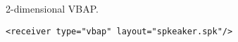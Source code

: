 2-dimensional VBAP.

\begin{lstlisting}[numbers=none]
<receiver type="vbap" layout="spkeaker.spk"/>
\end{lstlisting}


